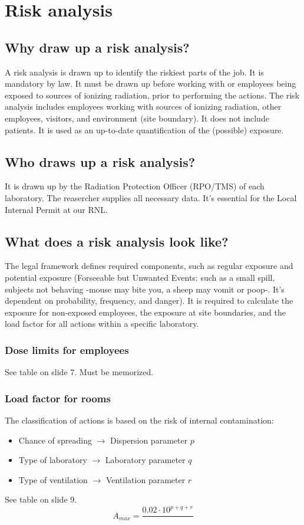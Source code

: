 \section{Risk analysis}
\subsection{Why draw up a risk analysis?}
A risk analysis is drawn up to identify the riskiest parts of the job. It is mandatory by law. It must be drawn up before working with or employees being exposed to sources of ionizing radiation, prior to performing the actions. The risk analysis includes employees working with sources of ionizing radiation, other employees, visitors, and environment (site boundary). It does not include patients. It is used as an up-to-date quantification of the (possible) exposure.

\subsection{Who draws up a risk analysis?}
It is drawn up by the Radiation Protection Officer (RPO/TMS) of each laboratory. The reasercher supplies all necessary data. It's essential for the Local Internal Permit at our RNL.

\subsection{What does a risk analysis look like?}
The legal framework defines required components, such as regular exposure and potential exposure (Forseeable but Unwanted Events: such as a small spill, subjects not behaving -mouse may bite you, a sheep may vomit or poop-. It's dependent on probability, frequency, and danger). It is required to calculate the exposure for non-exposed employees, the exposure at site boundaries, and the load factor for all actions within a specific laboratory.

\subsubsection{Dose limits for employees}
See table on slide 7. Must be memorized.

\subsubsection{Load factor for rooms}
The classification of actions is based on the risk of internal contamination:
\begin{itemize}
	\item Chance of spreading $\rightarrow$ Dispersion parameter $p$
	\item Type of laboratory $\rightarrow$ Laboratory parameter $q$
	\item Type of ventilation $\rightarrow$ Ventilation parameter $r$
\end{itemize}
See table on slide 9.
\[ A_{max} = \frac{0.02 \cdot 10^{p+q+r}}{}\]

